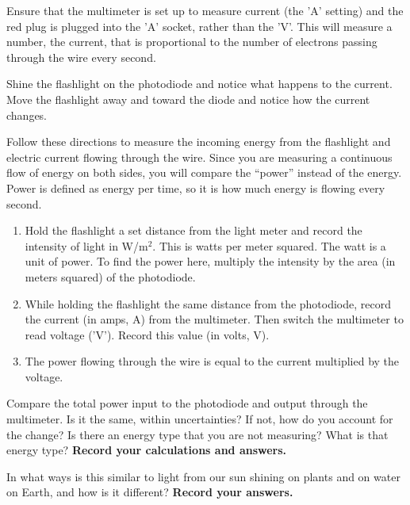 \begin{steps}
	\item Ensure that the multimeter is set up to measure current (the 'A' setting) and the red plug is plugged into the 'A' socket, rather than the 'V'. This will measure a number, the current, that is proportional to the number of electrons passing through the wire every second.
	
	\item Shine the flashlight on the photodiode and notice what happens to the current. Move the flashlight away and toward the diode and notice how the current changes.
	
	\item Follow these directions to measure the incoming energy from the flashlight and electric current flowing through the wire. Since you are measuring a continuous flow of energy on both sides, you will compare the ``power'' instead of the energy. Power is defined as energy per time, so it is how much energy is flowing every second.
	\begin{enumerate}
		\item Hold the flashlight a set distance from the light meter and record the intensity of light in W/m$^2$. This is watts per meter squared. The watt is a unit of power. To find the power here, multiply the intensity by the area (in meters squared) of the photodiode.
		
		\item While holding the flashlight the same distance from the photodiode, record the current (in amps, A) from the multimeter. Then switch the multimeter to read voltage ('V'). Record this value (in volts, V).
		
		\item The power flowing through the wire is equal to the current multiplied by the voltage.
	\end{enumerate}

	\item Compare the total power input to the photodiode and output through the multimeter. Is it the same, within uncertainties? If not, how do you account for the change? Is there an energy type that you are not measuring? What is that energy type? \textbf{Record your calculations and answers.}
	
	\item In what ways is this similar to light from our sun shining on plants and on water on Earth, and how is it different? \textbf{Record your answers.}
\end{steps}

